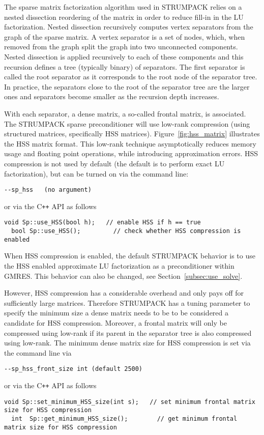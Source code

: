 \documentclass{article}
\begin{document}

The sparse matrix factorization algorithm used in STRUMPACK relies on
a nested dissection reordering of the matrix in order to reduce
fill-in in the LU factorization. Nested dissection recursively
computes vertex separators from the graph of the sparse matrix. A
vertex separator is a set of nodes, which, when removed from the graph
split the graph into two unconnected components. Nested dissection is
applied recursively to each of these components and this recursion
defines a tree (typically binary) of separators. The first separator
is called the root separator as it corresponds to the root node of the
separator tree. In practice, the separators close to the root of the
separator tree are the larger ones and separators become smaller as
the recursion depth increases.

With each separator, a dense matrix, a so-called frontal matrix, is
associated. The STRUMPACK sparse preconditioner will use low-rank
compression (using structured matrices, specifically HSS
matrices). Figure~\ref{fig:hss_matrix} illustrates the HSS matrix
format. This low-rank technique asymptotically reduces memory usage
and floating point operations, while introducing approximation
errors. HSS compression is not used by default (the default is to
perform exact LU factorization), but can be turned on via the command
line:
\begin{lstlisting}[style=Bash]
  --sp_hss   (no argument)
\end{lstlisting}
or via the C\texttt{++} API as follows
\begin{lstlisting}[style=C]
  void Sp::use_HSS(bool h);   // enable HSS if h == true
  bool Sp::use_HSS();         // check whether HSS compression is enabled
\end{lstlisting}
When HSS compression is enabled, the default STRUMPACK behavior is to
use the HSS enabled approximate LU factorization as a preconditioner
within GMRES. This behavior can also be changed, see
Section~\ref{subsec:use_solve}.

However, HSS compression has a considerable overhead and only pays off
for sufficiently large matrices. Therefore STRUMPACK has a tuning
parameter to specify the minimum size a dense matrix needs to be to be
considered a candidate for HSS compression. Moreover, a frontal matrix
will only be compressed using low-rank if its parent in the separator
tree is also compressed using low-rank.  The minimum dense matrix size
for HSS compression is set via the command line via
\begin{lstlisting}[style=Bash]
  --sp_hss_front_size int (default 2500)
\end{lstlisting}
or via the C\texttt{++} API as follows
\begin{lstlisting}[style=C]
  void Sp::set_minimum_HSS_size(int s);   // set minimum frontal matrix size for HSS compression
  int  Sp::get_minimum_HSS_size();        // get minimum frontal matrix size for HSS compression
\end{lstlisting}
\end{document}
